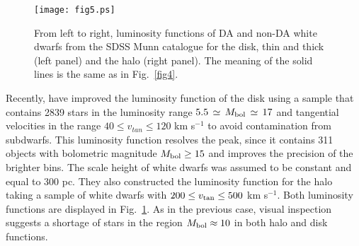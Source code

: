 \documentclass[useAMS,usenatbib]{mnras}
\begin{document}

\begin{figure}
\centering
\texttt{[image: fig5.ps]}
\caption{From left  to right,  luminosity functions  of DA  and non-DA
  white dwarfs from  the SDSS Munn catalogue for the disk, thin and thick (left panel) and the halo (right panel). The meaning of the solid lines is the same as in Fig.~\ref{fig4}.}
\label{fig5}
\end{figure}


Recently, \citet{munn17} have improved the \citet{harr06} luminosity function of the disk using a sample that 
contains 2839 stars in the luminosity range $5.5\, \simeq \, M_{\rm bol}\, \simeq \, 17$ and tangential velocities  
in the range $40 \le v_{tan} \le 120$ km s$^{-1}$ to avoid contamination from subdwarfs. This luminosity function 
resolves the peak, since it contains 311 objects with bolometric magnitude $M_{\rm bol} \ge 15$ and improves the 
precision of the brighter bins. The scale height of white dwarfs was assumed to be constant and equal to 300 pc. 
They also constructed the luminosity function for the halo taking a sample of white dwarfs with $ 200 \le v_{\rm tan} 
\le 500$ km s$^{-1}$. Both luminosity functions are displayed in Fig.~\ref{fig5}. As in the previous case, visual 
inspection suggests a shortage of stars in the region $M_{\rm bol} \approx 10$ in both halo and disk functions. 
\end{document}
